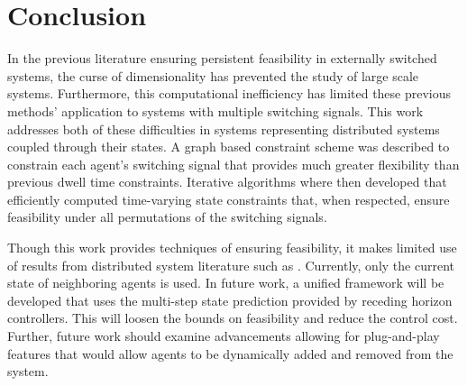 \section{Conclusion}
In the previous literature ensuring persistent feasibility in externally switched systems, the curse of dimensionality has prevented the study of large scale systems. Furthermore, this computational inefficiency has limited these previous methods' application to systems with multiple switching signals. This work addresses both of these difficulties in systems representing distributed systems coupled through their states. A graph based constraint scheme was described to constrain each agent's switching signal that provides much greater flexibility than previous dwell time constraints. Iterative algorithms where then developed that efficiently computed time-varying state constraints that, when respected, ensure feasibility under all permutations of the switching signals. 

Though this work provides techniques of ensuring feasibility, it makes limited use of results from distributed system literature such as \cite{Monasterios2019}. Currently, only the current state of neighboring agents is used. In future work, a unified framework will be developed that uses the multi-step state prediction provided by receding horizon controllers. This will loosen the bounds on feasibility and reduce the control cost. Further, future work should examine advancements allowing for plug-and-play features that would allow agents to be dynamically added and removed from the system. 